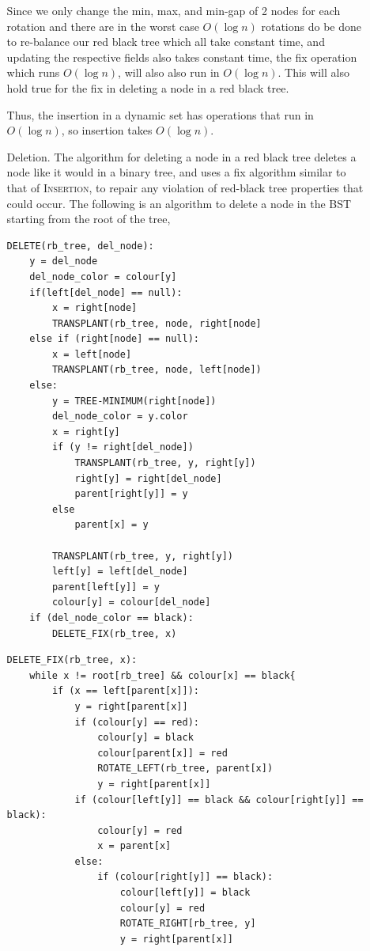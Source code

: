\documentclass[12pt]{article}
\theoremstyle{definition}
\theoremstyle{remark}
\begin{document}
\begin{enumerate}
\begin{enumerate}
Since we only change the min, max, and min-gap of 2 nodes for each rotation and there are in the worst case $O(\log n)$ rotations do be done to re-balance our red black tree which all take constant time, and updating the respective fields also takes constant time, the fix operation which runs $O(\log n )$, will also also run in $O(\log n )$. This will also hold true for the fix in deleting a node in a red black tree. 

Thus, the insertion in a dynamic set has operations that run in $O(\log n)$, so insertion takes $O(\log n)$.

\item[\sc Deletion.] The algorithm for deleting a node in a red black tree deletes a node like it would in a binary tree, and uses a fix algorithm similar to that of \textsc{Insertion}, to repair any violation of red-black tree properties that could occur. The following is an algorithm to delete a node in the BST starting from the root of the tree, 

\begin{lstlisting}[caption = deleting a node]
DELETE(rb_tree, del_node):
    y = del_node
    del_node_color = colour[y]
    if(left[del_node] == null):
        x = right[node]
        TRANSPLANT(rb_tree, node, right[node]
    else if (right[node] == null):
        x = left[node]
        TRANSPLANT(rb_tree, node, left[node])
    else:
        y = TREE-MINIMUM(right[node])
        del_node_color = y.color
        x = right[y]
        if (y != right[del_node])
            TRANSPLANT(rb_tree, y, right[y])
            right[y] = right[del_node]
            parent[right[y]] = y
        else 
            parent[x] = y

        TRANSPLANT(rb_tree, y, right[y])
        left[y] = left[del_node]
        parent[left[y]] = y 
        colour[y] = colour[del_node] 
    if (del_node_color == black):
        DELETE_FIX(rb_tree, x)
\end{lstlisting}
\begin{lstlisting}[caption = fixing a red-black tree after deletion]
DELETE_FIX(rb_tree, x):
    while x != root[rb_tree] && colour[x] == black{
        if (x == left[parent[x]]):
            y = right[parent[x]]
            if (colour[y] == red):
                colour[y] = black 
                colour[parent[x]] = red 
                ROTATE_LEFT(rb_tree, parent[x])
                y = right[parent[x]]
            if (colour[left[y]] == black && colour[right[y]] == black):
                colour[y] = red 
                x = parent[x]
            else:
                if (colour[right[y]] == black): 
                    colour[left[y]] = black 
                    colour[y] = red
                    ROTATE_RIGHT[rb_tree, y]
                    y = right[parent[x]]
                    

\end{lstlisting}
\end{enumerate}
\end{enumerate}
\end{document}
